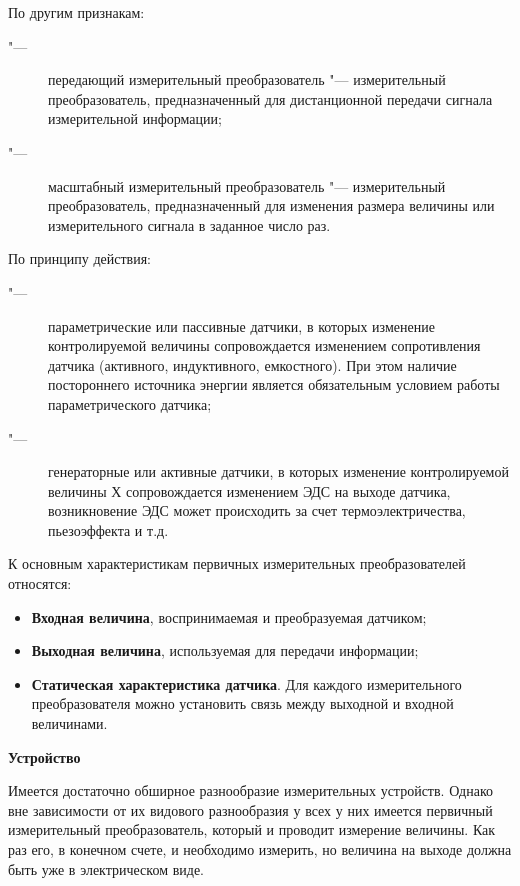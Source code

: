 \documentclass{article}
\begin{document}
\vspace{1cm}
По другим признакам:
\begin{description}
  \item["---] передающий измерительный преобразователь "--- измерительный
    преобразователь, предназначенный для дистанционной передачи сигнала
    измерительной информации;
  \item["---] масштабный измерительный преобразователь "--- измерительный
    преобразователь, предназначенный для изменения размера величины или
    измерительного сигнала в заданное число раз.
\end{description}

\vspace{1cm}
По принципу действия:
\begin{description}
  \item["---] параметрические или пассивные датчики, в которых изменение
    контролируемой величины сопровождается изменением сопротивления датчика
    (активного, индуктивного, емкостного). При этом наличие постороннего
    источника энергии является обязательным условием работы параметрического
    датчика;
  \item["---] генераторные или активные датчики, в которых изменение
    контролируемой величины Х сопровождается изменением ЭДС на выходе датчика,
    возникновение ЭДС может происходить за счет термоэлектричества, пьезоэффекта
    и т.д.
\end{description}

\vspace{1cm}
К основным характеристикам первичных измерительных преобразователей относятся:
\begin{itemize}
  \item \textbf{Входная величина}, воспринимаемая и преобразуемая датчиком;
  \item \textbf{Выходная величина}, используемая для передачи информации;
  \item \textbf{Статическая характеристика датчика}. Для каждого измерительного
        преобразователя можно установить связь между выходной и входной
        величинами.
\end{itemize}

\vspace{1cm}
\begin{center}\textbf{\Large Устройство}\end{center}
\vspace{0.5cm}

Имеется достаточно обширное разнообразие измерительных устройств. Однако вне
зависимости от их видового разнообразия у всех у них имеется первичный
измерительный преобразователь, который и проводит измерение величины. Как раз
его, в конечном счете, и необходимо измерить, но величина на выходе должна быть
уже в электрическом виде.
\end{document}
